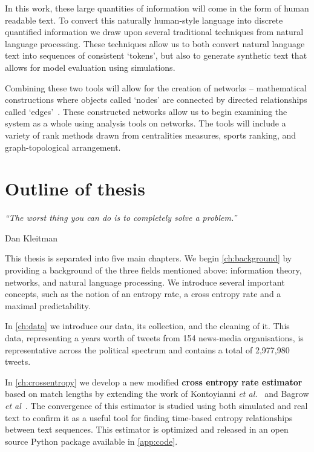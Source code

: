 In this work, these large quantities of information will come in the form of human readable text. To convert this naturally human-style language into discrete quantified information we draw upon several traditional techniques from natural language processing. These techniques allow us to both convert natural language text into sequences of consistent `tokens', but also to generate synthetic text that allows for model evaluation using simulations. 

Combining these two tools will allow for the creation of networks -- mathematical constructions where objects called `nodes' are connected by directed relationships called `edges'~\cite{newman_networks_2018}. These constructed networks allow us to begin examining the system as a whole using analysis tools on networks. The tools will include a variety of rank methods drawn from centralities measures, sports ranking, and graph-topological arrangement.


\section{Outline of thesis}

\epigraph{ \em ``The worst thing you can do is to completely solve a problem.''}{Dan Kleitman}


This thesis is separated into five main chapters. We begin \autoref{ch:background} by providing a background of the three fields mentioned above: information theory, networks, and natural language processing. We introduce several important concepts, such as the notion of an entropy rate, a cross entropy rate and a maximal predictability.

In \autoref{ch:data} we introduce our data, its collection, and the cleaning of it. This data, representing a years worth of tweets from 154 news-media organisations, is representative across the political spectrum and contains a total of 2,977,980 tweets. 

In \autoref{ch:crossentropy} we develop a new modified \textbf{cross entropy rate estimator} based on match lengths by extending the work of Kontoyianni \emph{et al.}~\cite{kontoyiannis_nonparametric_1998} and Bagrow \emph{et al}~\cite{bagrowInformationFlowReveals2019}. The convergence of this estimator is studied using both simulated and real text to confirm it as a useful tool for finding time-based entropy relationships between text sequences. This estimator is optimized and released in an open source Python package available in \autoref{app:code}. 

